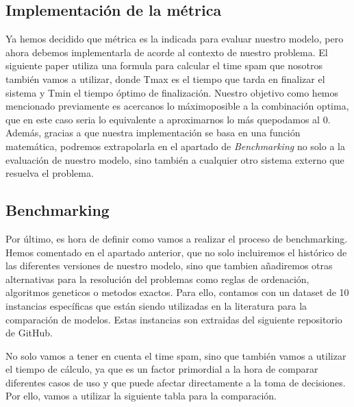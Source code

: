 \subsection{Implementación de la métrica}
Ya hemos decidido que métrica es la indicada para evaluar nuestro modelo, pero ahora debemos
implementarla de acorde al contexto de nuestro problema. El siguiente paper utiliza una formula para
calcular el time spam que nosotros también vamos a utilizar, donde Tmax es el tiempo que tarda en
finalizar el sistema y Tmin el tiempo óptimo de finalización. Nuestro objetivo como hemos mencionado
previamente es acercanos lo máximoposible a la combinación optima, que en este caso seria lo equivalente a
aproximarnos lo más quepodamos al 0. Además, gracias a que nuestra implementación se basa en una función
matemática, podremos extrapolarla en el apartado de \textit{Benchmarking} no solo a la evaluación de nuestro
modelo, sino también a cualquier otro sistema externo que resuelva el problema.


\subsection{Benchmarking}
Por último, es hora de definir como vamos a realizar el proceso de benchmarking. Hemos comentado en
el apartado anterior, que no solo incluiremos el histórico de las diferentes versiones de nuestro
modelo, sino que tambien añadiremos otras alternativas para la resolución del problemas como reglas de
ordenación, algoritmos geneticos o metodos exactos. Para ello, contamos con un dataset de 10 instancias
específicas que están siendo utilizadas en la literatura para la comparación de modelos. Estas instancias
son extraidas del siguiente repositorio \cite*{ptal} de GitHub.\medskip

No solo vamos a tener en cuenta el time spam, sino que también vamos a utilizar el tiempo de cálculo,
ya que es un factor primordial a la hora de comparar diferentes casos de uso y que puede afectar
directamente a la toma de decisiones. Por ello, vamos a utilizar la siguiente tabla para la comparación.


